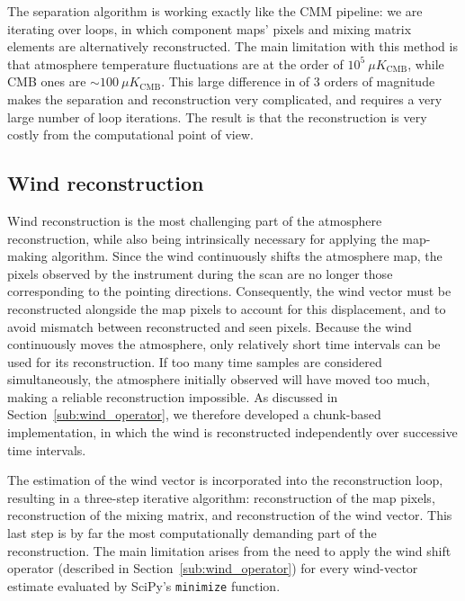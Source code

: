 \documentclass[../../thesis.tex]{subfiles}
\begin{document}
The separation algorithm is working exactly like the CMM pipeline: we are iterating over loops, in which component maps' pixels and mixing matrix elements are alternatively reconstructed. The main limitation with this method is that atmosphere temperature fluctuations are at the order of $10^{5}~\mu K_\text{CMB}$, while CMB ones are $\sim 100~\mu K_\text{CMB}$. This large difference in of $3$ orders of magnitude makes the separation and reconstruction very complicated, and requires a very large number of loop iterations. The result is that the reconstruction is very costly from the computational point of view.

\subsection{Wind reconstruction} \label{sub:wind}


Wind reconstruction is the most challenging part of the atmosphere reconstruction, while also being intrinsically necessary for applying the map-making algorithm. Since the wind continuously shifts the atmosphere map, the pixels observed by the instrument during the scan are no longer those corresponding to the pointing directions. Consequently, the wind vector must be reconstructed alongside the map pixels to account for this displacement, and to avoid mismatch between reconstructed and seen pixels.
Because the wind continuously moves the atmosphere, only relatively short time intervals can be used for its reconstruction. If too many time samples are considered simultaneously, the atmosphere initially observed will have moved too much, making a reliable reconstruction impossible. As discussed in Section~\ref{sub:wind_operator}, we therefore developed a chunk-based implementation, in which the wind is reconstructed independently over successive time intervals.

The estimation of the wind vector is incorporated into the reconstruction loop, resulting in a three-step iterative algorithm: reconstruction of the map pixels, reconstruction of the mixing matrix, and reconstruction of the wind vector. This last step is by far the most computationally demanding part of the reconstruction. The main limitation arises from the need to apply the wind shift operator (described in Section~\ref{sub:wind_operator}) for every wind-vector estimate evaluated by SciPy's \texttt{minimize} function.
\end{document}
